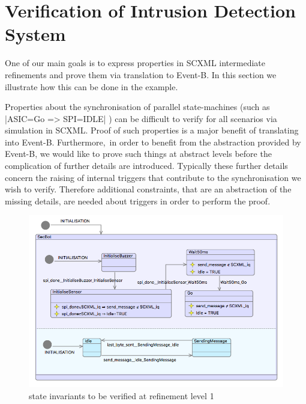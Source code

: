 
\section{Verification of Intrusion Detection System}
\label{sec:example}

One of our main goals is to express properties in SCXML intermediate refinements and prove them via translation to Event-B.
In this section we illustrate how this can be done in the \IDS example.
 
Properties about the synchronisation of parallel state-machines (such as |ASIC=Go => SPI=IDLE|
) can be difficult to verify for all scenarios via simulation in SCXML. 
Proof of such properties is a major benefit of translating into Event-B.  
Furthermore, in order to benefit from the abstraction provided by Event-B, we would like to prove such things at abstract levels before the complication of further details are introduced. 
Typically these further details concern the raising of internal triggers that contribute to the synchronisation we wish to verify. 
Therefore additional constraints, that are an abstraction of the missing details, are needed about triggers in order to perform the proof.

\begin{figure}[!htbp]
	\centering
	\includegraphics[width=1.0\textwidth]{figures/iumlb_verif}
	\caption{state invariants to be verified at refinement level 1}
	\label{fig:iumlb-verif}
\end{figure}

